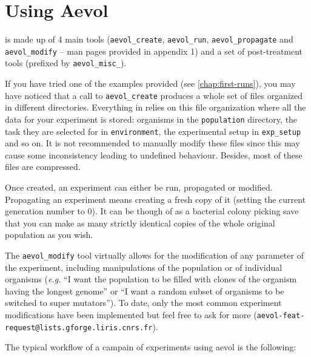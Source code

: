 \chapter{Using Aevol}
\label{chap:using-aevol}


\vspace{5mm}

\aevol{} is made up of 4 main tools (\verb?aevol_create?, \verb?aevol_run?, \verb?aevol_propagate? and \verb?aevol_modify? -- man pages provided in appendix 1) and a set of post-treatment tools (prefixed by \verb?aevol_misc_?).

If you have tried one of the examples provided (see \ref{chap:first-runs}), you may have noticed that a call to \verb?aevol_create? produces a whole set of files organized in different directories. Everything in \aevol{} relies on this file organization where all the data for your experiment is stored: organisms in the \verb?population? directory, the task they are selected for in \verb?environment?, the experimental setup in \verb?exp_setup? and so on. It is not recommended to manually modify these files since this may cause some inconsistency leading to undefined behaviour. Besides, most of these files are compressed.

Once created, an experiment can either be run, propagated or modified.
Propagating an experiment means creating a fresh copy of it (setting the current generation number to 0). It can be though of as a bacterial colony picking save that you can make as many strictly identical copies of the whole original population as you wish.

The \verb?aevol_modify? tool virtually allows for the modification of any parameter of the experiment, including manipulations of the population or of individual organisms (\emph{e.g.} ``I want the population to be filled with clones of the organism having the longest genome'' or ``I want a random subset of organisms to be switched to super mutators''). To date, only the most common experiment modifications have been implemented but feel free to ask for more (\verb?aevol-feat-request@lists.gforge.liris.cnrs.fr?).

The typical workflow of a campain of experiments using aevol is the following:

